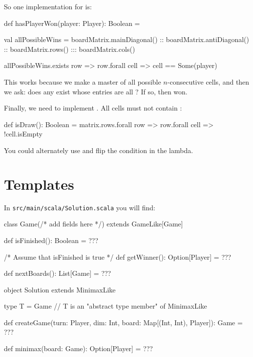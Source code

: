 \documentclass[9pt]{extbook}
\begin{document}
So one implementation for  is:

\begin{scalacode}
def hasPlayerWon(player: Player): Boolean = {
  val allPossibleWins =
    boardMatrix.mainDiagonal() ::
    boardMatrix.antiDiagonal() ::
    boardMatrix.rows() :::
    boardMatrix.cols()

  allPossibleWins.exists { row => row.forall { cell => cell == Some(player) } }
}
\end{scalacode}

This works because we make a master  of all possible $n$-consecutive cells, and then we ask: does any \scalainline{[List[Option[Player]]} exist whose entries are all ?  If so, then  won.

Finally, we need to implement .  All cells must not contain :

\begin{scalacode}
  def isDraw(): Boolean = {
    matrix.rows.forall { row =>
      row.forall { cell => !cell.isEmpty }
    }
  }
\end{scalacode}

You could alternately use  and flip the condition in the lambda.

\section{Templates}

In \texttt{src/main/scala/Solution.scala} you will find:

\begin{scalacode}
class Game(/* add fields here */) extends GameLike[Game] {

  def isFinished(): Boolean = ???

  /* Assume that isFinished is true */
  def getWinner(): Option[Player] = ???

  def nextBoards(): List[Game] = ???
}

object Solution extends MinimaxLike {

  type T = Game // T is an "abstract type member" of MinimaxLike

  def createGame(turn: Player, dim: Int, board: Map[(Int, Int), Player]): Game = ???

  def minimax(board: Game): Option[Player] = ???

}
\end{scalacode}
\end{document}
